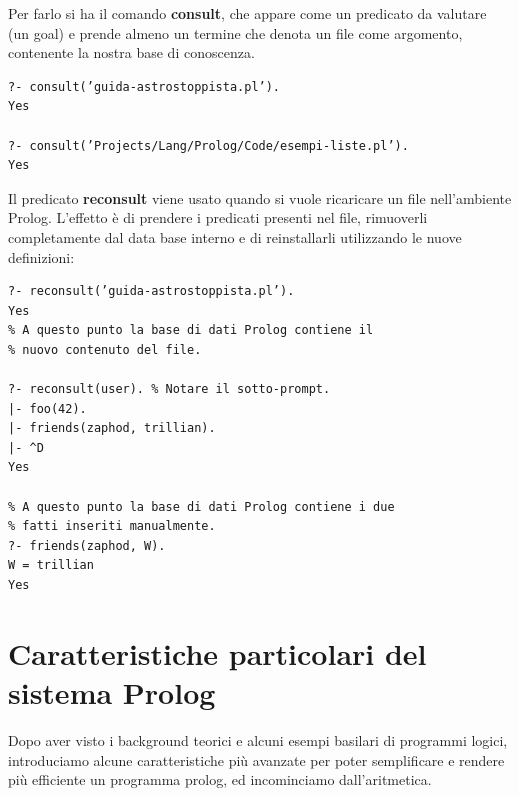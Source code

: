\documentclass[a4paper]{book}
\begin{document}
Per farlo si ha il comando \textbf{consult}, che appare come un predicato da valutare (un goal) e prende almeno un termine che denota un file
come argomento, contenente la nostra base di conoscenza.
\begin{verbatim}
?- consult(’guida-astrostoppista.pl’).
Yes

?- consult(’Projects/Lang/Prolog/Code/esempi-liste.pl’).
Yes
\end{verbatim}
Il predicato \textbf{reconsult} viene usato quando si vuole ricaricare un file nell'ambiente Prolog.\newline
L’effetto è di prendere i predicati presenti nel file, rimuoverli completamente dal data base interno
e di reinstallarli utilizzando le nuove definizioni:
\begin{verbatim}
?- reconsult(’guida-astrostoppista.pl’).
Yes
% A questo punto la base di dati Prolog contiene il
% nuovo contenuto del file.

?- reconsult(user). % Notare il sotto-prompt.
|- foo(42).
|- friends(zaphod, trillian).
|- ^D
Yes

% A questo punto la base di dati Prolog contiene i due
% fatti inseriti manualmente.
?- friends(zaphod, W).
W = trillian
Yes
\end{verbatim}

\section{Caratteristiche particolari del sistema Prolog}
Dopo aver visto i background teorici e alcuni esempi basilari di programmi logici, introduciamo alcune caratteristiche più avanzate
per poter semplificare e rendere più efficiente un programma prolog, ed incominciamo dall'aritmetica.
\end{document}
